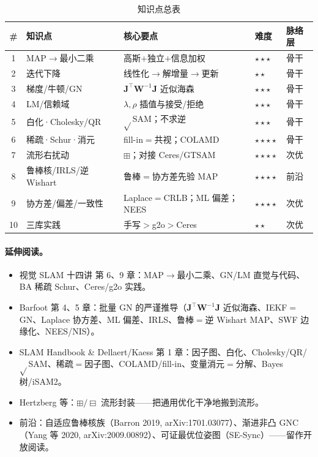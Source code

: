 \begin{table}[H]\centering\small
\caption{知识点总表}
\begin{tabular}{cllll}
\toprule
\# & 知识点 & 核心要点 & 难度 & 脉络层 \\
\midrule
1 & MAP$\to$最小二乘 & 高斯$+$独立$+$信息加权 & \(\star\star\star\) & 骨干 \\
2 & 迭代下降 & 线性化$\to$解增量$\to$更新 & \(\star\star\) & 骨干 \\
3 & 梯度/牛顿/GN & $\mathbf{J}^\top\mathbf{W}^{-1}\mathbf{J}$ 近似海森 & \(\star\star\star\) & 骨干 \\
4 & LM/信赖域 & $\lambda,\rho$ 插值与接受/拒绝 & \(\star\star\star\) & 骨干 \\
5 & 白化·Cholesky/QR & $\sqrt{}$SAM；不求逆 & \(\star\star\star\) & 骨干 \\
6 & 稀疏·Schur·消元 & fill-in$=$共视；COLAMD & \(\star\star\star\star\) & 骨干 \\
7 & 流形右扰动 & $\boxplus$；对接 Ceres/GTSAM & \(\star\star\star\star\) & 次优 \\
8 & 鲁棒核/IRLS/逆 Wishart & 鲁棒$=$协方差先验 MAP & \(\star\star\star\star\) & 前沿 \\
9 & 协方差/偏差/一致性 & Laplace$=$CRLB；ML 偏差；NEES & \(\star\star\star\star\) & 次优 \\
10 & 三库实践 & 手写$>$g2o$>$Ceres & \(\star\star\) & 次优 \\
\bottomrule
\end{tabular}
\end{table}

\paragraph{延伸阅读。}
\begin{itemize}
  \item 视觉 SLAM 十四讲\cite{gaoxiang2019slam14} 第 6、9 章：MAP$\to$最小二乘、GN/LM 直觉与代码、BA 稀疏 Schur、Ceres/g2o 实践。
  \item Barfoot\cite{barfoot2024state} 第 4、5 章：批量 GN 的严谨推导（$\mathbf{J}^\top\mathbf{W}^{-1}\mathbf{J}$ 近似海森、IEKF$=$GN、Laplace 协方差、ML 偏差、IRLS、鲁棒$=$逆 Wishart MAP、SWF 边缘化、NEES/NIS）。
  \item SLAM Handbook\cite{carlone2026handbook} \& Dellaert/Kaess\cite{dellaert2017factor} 第 1 章：因子图、白化、Cholesky/QR/$\sqrt{}$SAM、稀疏$=$因子图、COLAMD/fill-in、变量消元$=$分解、Bayes 树/iSAM2。
  \item Hertzberg 等\cite{hertzberg2013integrating}：$\boxplus/\boxminus$ 流形封装——把通用优化干净地搬到流形。
  \item 前沿：自适应鲁棒核族（Barron 2019, arXiv:1701.03077）、渐进非凸 GNC（Yang 等 2020, arXiv:2009.00892）、可证最优位姿图（SE-Sync）——留作开放阅读。
\end{itemize}

